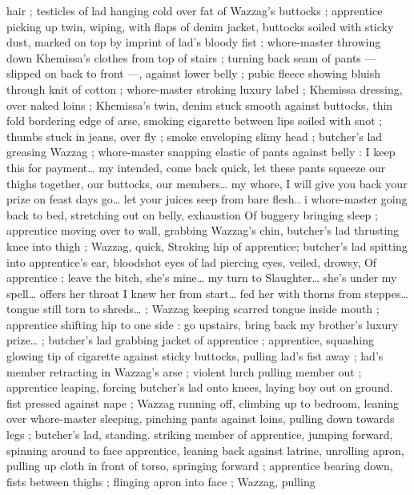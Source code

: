 hair ; testicles of lad hanging cold over fat of Wazzag's buttocks ; 
apprentice picking up twin, wiping, with flaps of denim jacket, 
buttocks soiled with sticky dust, marked on top by imprint of lad's 
bloody fist ; whore-master throwing down Khemissa's clothes from 
top of stairs ; turning back seam of pants --- slipped on back to front 
---, against lower belly ; pubic fleece showing bluish through knit of 
cotton ; whore-master stroking luxury label ; Khemissa dressing, over 
naked loins ; Khemissa's twin, denim stuck smooth against buttocks, 
thin fold bordering edge of arse, smoking cigarette between lips 
soiled with snot ; thumbs stuck in jeans, over fly ; smoke enveloping 
slimy head ; butcher's lad greasing Wazzag ; whore-master snapping 
elastic of pants against belly : {\gl}{\td} I keep this for payment{\ldots} my 
intended, come back quick, let these pants squeeze our thighs 
together, our buttocks, our members{\ldots} my whore, I will give you back 
your prize on feast days{\td} go{\ldots} let your juices seep from bare flesh..{\gr} 
i whore-master going back to bed, stretching out on belly, exhaustion 
Of buggery bringing sleep ; apprentice moving over to wall, grabbing 
Wazzag's chin, butcher's lad thrusting knee into thigh ; Wazzag, 
quick, Stroking hip of apprentice; butcher's lad spitting into 
apprentice's ear, bloodshot eyes of lad piercing eyes, veiled, drowsy, 
Of apprentice ; {\gl}{\td} leave the bitch, she's mine{\ldots} my turn to 
Slaughter{\ldots} she's under my spell{\ldots} offers her throat{\td} I knew her from 
start{\ldots} fed her with thorns from steppes{\ldots} tongue still torn to 
shreds{\ldots}{\gr} ; Wazzag keeping scarred tongue inside mouth ; 
apprentice shifting hip to one side : {\gl} go upstairs, bring back my 
brother's luxury prize{\ldots}{\gr} ; butcher's lad grabbing jacket of 
apprentice ; apprentice, squashing glowing tip of cigarette against 
sticky buttocks, pulling lad's fist away ; lad's member retracting in 
Wazzag's arse ; violent lurch pulling member out ; apprentice 
leaping, forcing butcher's lad onto knees, laying boy out on ground. 
fist pressed against nape ; Wazzag running off, climbing up to 
bedroom, leaning over whore-master sleeping, pinching pants 
against loins, pulling down towards legs ; butcher's lad, standing. 
striking member of apprentice, jumping forward, spinning around to 
face apprentice, leaning back against latrine, unrolling apron, pulling 
up cloth in front of torso, springing forward ; apprentice bearing 
down, fists between thighs ; flinging apron into face ; Wazzag, pulling 
